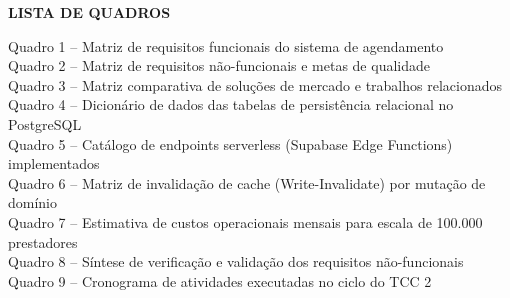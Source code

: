 \documentclass[12pt,a4paper]{article}
\begin{document}
\vspace{1.2cm}
\centering
{\textbf{LISTA DE QUADROS} \par}
\vspace{0.8cm}
\justifying
\noindent
Quadro 1 -- Matriz de requisitos funcionais do sistema de agendamento \dotfill \pageref{quadro:requisitos_funcionais} \\
Quadro 2 -- Matriz de requisitos não-funcionais e metas de qualidade \dotfill \pageref{quadro:requisitos_nao_funcionais} \\
Quadro 3 -- Matriz comparativa de soluções de mercado e trabalhos relacionados \dotfill \pageref{quadro:trabalhos_relacionados} \\
Quadro 4 -- Dicionário de dados das tabelas de persistência relacional no PostgreSQL \dotfill \pageref{quadro:dicionario_dados} \\
Quadro 5 -- Catálogo de endpoints serverless (Supabase Edge Functions) implementados \dotfill \pageref{quadro:catalogo_endpoints} \\
Quadro 6 -- Matriz de invalidação de cache (Write-Invalidate) por mutação de domínio \dotfill \pageref{quadro:invalidacao_cache} \\
Quadro 7 -- Estimativa de custos operacionais mensais para escala de 100.000 prestadores \dotfill \pageref{quadro:custos_escala} \\
Quadro 8 -- Síntese de verificação e validação dos requisitos não-funcionais \dotfill \pageref{quadro:validacao_rnf} \\
Quadro 9 -- Cronograma de atividades executadas no ciclo do TCC 2 \dotfill \pageref{tab:cronograma_detalhado}

\newpage
\pagestyle{empty}
\end{document}
